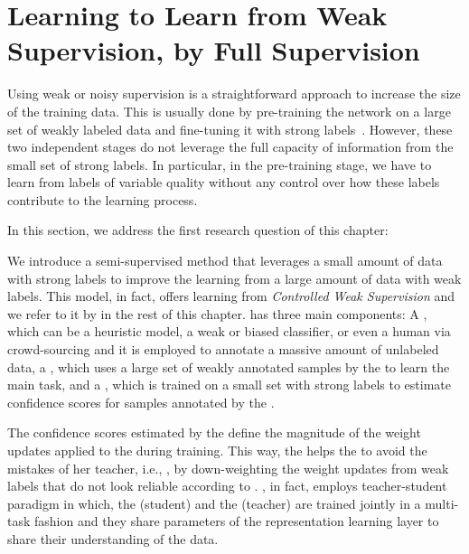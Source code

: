\section{Learning to Learn from Weak Supervision, by Full Supervision}
\label{sec:meta_learning}
Using weak or noisy supervision is a straightforward approach to increase the size of the training data. This is usually done by pre-training the network on a large set of weakly labeled data and fine-tuning it with strong labels~\cite{Dehghani:2017:SIGIR,Severyn:2015:SIGIR}. 
However, these two independent stages do not leverage the full capacity of information from the small set of strong labels.  In particular, in the pre-training stage, we have to learn from labels of variable quality without any control over how these labels contribute to the learning process.

In this section, we address the first research question of this chapter:

We introduce a semi-supervised method that leverages a small amount of data with strong labels to improve the learning from a large amount of data with weak labels. This model, in fact, offers learning from \emph{Controlled Weak Supervision} and we refer to it by \emph{\cws} in the rest of this chapter.
%
\cws has three main components:
A \wa, which can be a heuristic model, a weak or biased classifier, or even a human via crowd-sourcing and it is employed to annotate a massive amount of unlabeled data, a \tnet, which uses a large set of weakly annotated samples by the \wa to learn the main task, and a \cnet, which is trained on a small set with strong labels to estimate confidence scores for samples annotated by the \wa. 

The confidence scores estimated by the \cnet define the magnitude of the weight updates applied to the \tnet during training. This way, the \cnet helps the \tnet to avoid the mistakes of her teacher, i.e., \wa, by down-weighting the weight updates from weak labels that do not look reliable according to \cnet.
%
\cws, in fact, employs teacher-student paradigm in which, the \tnet (student) and the \cnet (teacher) are trained jointly in a multi-task fashion and they share parameters of the representation learning layer to share their understanding of the data.

